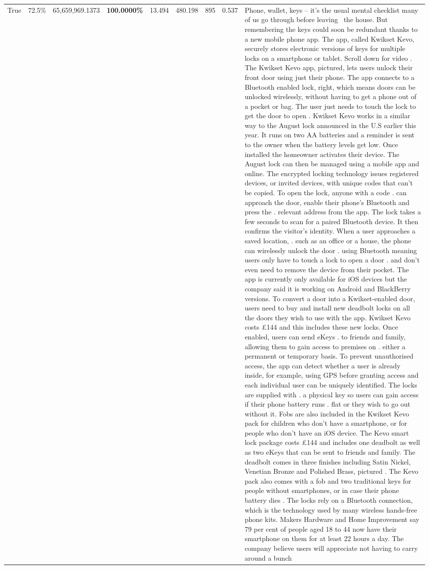 \begin{table}[H]
\begin{tabular}{lllrlllll}
True & 72.5\% & 65,659,969.1373 & \bfseries \color{red} 100.0000\% & 13.494 & 480.198 & 895 & 0.537 & Phone, wallet, keys – it’s the usual mental checklist many of us go through before leaving  the house. But remembering the keys could soon be redundant thanks to a new mobile phone app. The app, called Kwikset Kevo, securely stores electronic versions of keys for multiple locks on a smartphone or tablet. Scroll down for video . The Kwikset Kevo app, pictured, lets users unlock their front door using just their phone. The app connects to a Bluetooth enabled lock, right, which means doors can be unlocked wirelessly, without having to get a phone out of a pocket or bag. The user just needs to touch the lock to get the door to open . Kwikset Kevo works in a similar way to the August lock announced in the U.S earlier this year. It runs on two AA batteries and a reminder is sent to the owner when the battery levels get low. Once installed the homeowner activates their device. The August lock can then be managed using a mobile app and online. The encrypted locking technology issues registered devices, or invited devices, with unique codes that can't be copied. To open the lock, anyone with a code . can approach the door, enable their phone's Bluetooth and press the . relevant address from the app. The lock takes a few seconds to scan for a paired Bluetooth device. It then confirms the visitor's identity. When a user approaches a saved location, . such as an office or a house, the phone can wirelessly unlock the door . using Bluetooth meaning users only have to touch a lock to open a door . and don't even need to remove the device from their pocket. The app is currently only available for iOS devices but the company said it is working on Android and BlackBerry versions. To convert a door into a Kwikset-enabled door, users need to buy and install new deadbolt locks on all the doors they wish to use with the app. Kwikset Kevo costs £144 and this includes these new locks. Once enabled, users can send eKeys . to friends and family, allowing them to gain access to premises on . either a permanent or temporary basis. To prevent unauthorised access, the app can detect whether a user is already inside, for example, using GPS before granting access and each individual user can be uniquely identified. The locks are supplied with . a physical key so users can gain access if their phone battery runs . flat or they wish to go out without it. Fobs are also included in the Kwikset Kevo pack for children who don't have a smartphone, or for people who don't have an iOS device. The Kevo smart lock package costs £144 and includes one deadbolt as well as two eKeys that can be sent to friends and family. The deadbolt comes in three finishes including Satin Nickel, Venetian Bronze and Polished Brass, pictured . The Kevo pack also comes with a fob and two traditional keys for people without smartphones, or in case their phone battery dies . The locks rely on a Bluetooth connection, which is the technology used by many wireless hands-free phone kits. Makers Hardware and Home Improvement say 79 per cent of people aged 18 to 44 now have their smartphone on them for at least 22 hours a day. The company believe users will appreciate not having to carry around a bunch 
\end{tabular}
\end{table}
